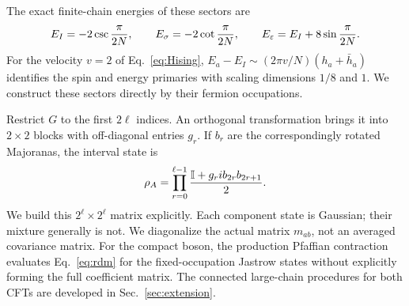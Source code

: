 The exact finite-chain energies of these sectors are
\begin{equation}
 E_I=-2\csc\frac\pi{2N},\qquad
 E_\sigma=-2\cot\frac\pi{2N},\qquad
 E_\varepsilon=E_I+8\sin\frac\pi{2N}.
 \label{eq:ising-energies}
\end{equation}
For the velocity $v=2$ of Eq.~\eqref{eq:Hising},
$E_a-E_I\sim(2\pi v/N)(h_a+\bar h_a)$ identifies the spin and energy
primaries with scaling dimensions $1/8$ and $1$. We construct these
sectors directly by their fermion occupations.



Restrict $G$ to the first $2\ell$ indices. An orthogonal transformation
brings it into $2\times2$ blocks with off-diagonal entries $g_r$. If $b_r$
are the correspondingly rotated Majoranas, the interval state is
\begin{equation}
 \rho_A=\prod_{r=0}^{\ell-1}
 \frac{\mathbb I+g_r i b_{2r}b_{2r+1}}2.
 \label{eq:gaussian}
\end{equation}
We build this $2^\ell\times2^\ell$ matrix explicitly. Each component
state is Gaussian; their mixture generally is not. We diagonalize the
actual matrix $m_{ab}$, not an averaged covariance matrix.
For the compact boson, the production Pfaffian contraction evaluates
Eq.~\eqref{eq:rdm} for the fixed-occupation Jastrow states without
explicitly forming the full coefficient matrix. The connected large-chain
procedures for both CFTs are developed in Sec.~\ref{sec:extension}.


